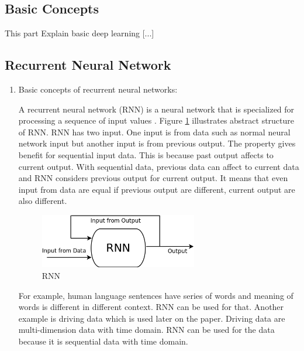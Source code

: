 \documentclass[draft,dvipsnames]{drexel-thesis}
\begin{document}
\begin{thesis}
\subsection{Basic Concepts}\label{subsec:basicDL}
{\color{blue} This part Explain basic deep learning [...]}

\subsection{Recurrent Neural Network}\label{subsec:RNN}

\begin{enumerate}
\item Basic concepts of recurrent neural networks:

	A recurrent neural network (RNN) is a neural network that is specialized for processing a sequence of input values \cite{Goodfellow-et-al-2016}. Figure \ref{fig:RNN} illustrates abstract structure of RNN. RNN has two input. One input is from data such as normal neural network input but another input is from previous output. The property gives benefit for sequential input data. This is because past output affects to current output. With sequential data, previous data can affect to current data and RNN considers previous output for current output. It means that even input from data are equal if previous output are different, current output are also different.
	
\begin{figure}[t!]
    \centering
    \includegraphics[width=0.65\textwidth]{pictures/figures/RNN.png}
    \caption{RNN}
    \label{fig:RNN}
\end{figure}
	
	For example, human language sentences have series of words and meaning of words is different in different context. RNN can be used for that. Another example is driving data which is used later on the paper.  Driving data are multi-dimension data with time domain. RNN can be used for the data because it is sequential data with time domain.
	

\end{enumerate}
\end{thesis}
\end{document}

